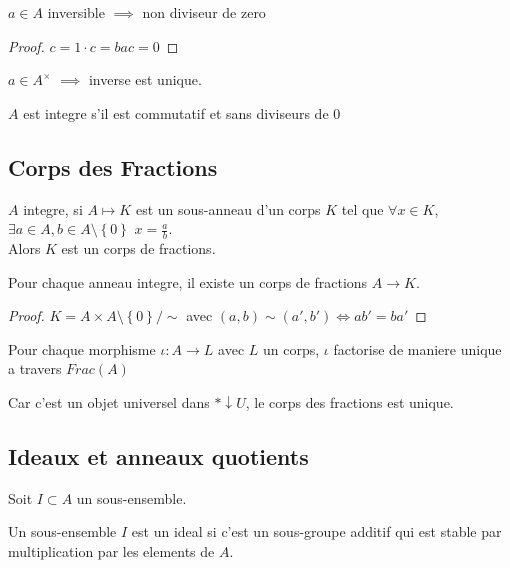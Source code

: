 \documentclass[../main.tex]{subfiles}
\begin{document}
\begin{propo}
$a\in A$ inversible $\implies$ non diviseur de zero
\end{propo}
\begin{proof}
$c=1\cdot c = bac=0$ 
\end{proof}
\begin{crly}
$a\in A^{\times}$ $\implies$ inverse est unique.
\end{crly}
\begin{defn}
$A$ est integre s'il est commutatif et sans diviseurs de 0
\end{defn}
\subsection{Corps des Fractions}
\begin{defn}
	$A$ integre, si $A \mapsto K$ est un sous-anneau d'un corps $K$ tel que $\forall x \in K$, $\exists a \in A,b\in A\setminus \left\{ 0 \right\} $ $x=\frac{a}{b}$.\\
	Alors $K$ est un corps de fractions.

\end{defn}
\begin{thm}
	Pour chaque anneau integre, il existe un corps de fractions $A\to K$.
\end{thm}
\begin{proof}
$K= A\times A\setminus \left\{ 0 \right\} /\sim$ avec $( a,b) \sim ( a',b') \iff ab'=ba'$ 
\end{proof}
\begin{propo}
Pour chaque morphisme $\iota:A\to L$ avec $L$ un corps, $\iota$ factorise de maniere unique a travers $Frac( A) $ 
\end{propo}
Car c'est un objet universel dans $\ast \downarrow U$, le corps des fractions est unique.
\subsection{Ideaux et anneaux quotients}
Soit $I \subset A$ un sous-ensemble.
\begin{defn}[Ideal]
	Un sous-ensemble $I$ est un ideal si c'est un sous-groupe additif qui est stable par multiplication par les elements de $A$.
\end{defn}
\end{document}
